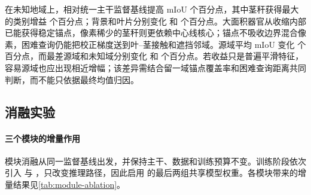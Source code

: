 \begin{table}[!htbp]
\centering
\caption{完整 GWFSS 数据地域划分上的类别 IoU 与 mIoU（\%）。}
\label{tab:region-main}
\end{table}

在未知地域上，\METHOD 相对统一主干监督基线提高 mIoU  个百分点，其中茎秆获得最大的类别增益  个百分点；背景和叶片分别变化  和  个百分点。大面积器官从收缩内部已能获得稳定锚点，像素稀少的茎秆则更依赖中心线核心；锚点不吸收边界混合像素，困难查询仍能把校正梯度送到叶--茎接触和遮挡邻域。源域平均 mIoU 变化  个百分点，而最差源域和未知域分别变化  和  个百分点。若收益只是普遍平滑特征，容易源域也应出现相近增幅；该差异需结合留一域锚点覆盖率和困难查询距离共同判断，而不能只依据最终均值归因。

\subsection{消融实验}
\label{sec:ablation}

\paragraph{三个模块的增量作用}
模块消融从同一监督基线出发，并保持主干、数据和训练预算不变。训练阶段依次引入 \TRPL 与 \TCPM，\BAZR 只改变推理路径，因此启用 \TCPM 的最后两组共享模型权重。各模块带来的增量结果见\cref{tab:module-ablation}。

